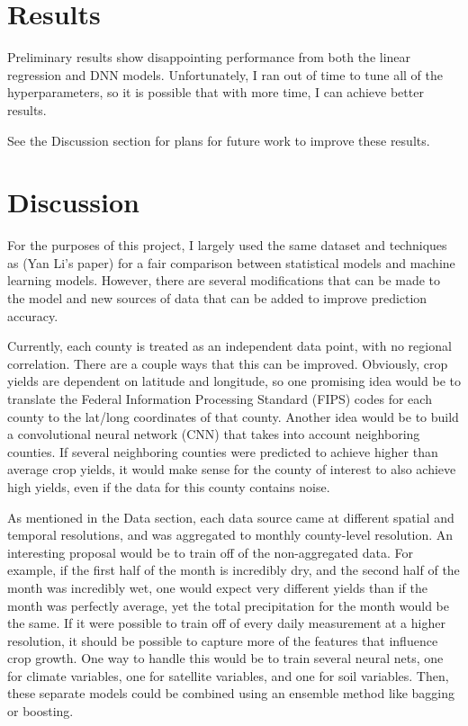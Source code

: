 \documentclass[letterpaper]{article}
\begin{document}
\section{Results}

Preliminary results show disappointing performance from both the linear regression and DNN models. Unfortunately, I ran out of time to tune all of the hyperparameters, so it is possible that with more time, I can achieve better results.

See the Discussion section for plans for future work to improve these results.

\section{Discussion}

For the purposes of this project, I largely used the same dataset and techniques as (Yan Li's paper) for a fair comparison between statistical models and machine learning models. However, there are several modifications that can be made to the model and new sources of data that can be added to improve prediction accuracy.

Currently, each county is treated as an independent data point, with no regional correlation. There are a couple ways that this can be improved. Obviously, crop yields are dependent on latitude and longitude, so one promising idea would be to translate the Federal Information Processing Standard (FIPS) codes for each county to the lat/long coordinates of that county. Another idea would be to build a convolutional neural network (CNN) that takes into account neighboring counties. If several neighboring counties were predicted to achieve higher than average crop yields, it would make sense for the county of interest to also achieve high yields, even if the data for this county contains noise.

As mentioned in the Data section, each data source came at different spatial and temporal resolutions, and was aggregated to monthly county-level resolution. An interesting proposal would be to train off of the non-aggregated data. For example, if the first half of the month is incredibly dry, and the second half of the month was incredibly wet, one would expect very different yields than if the month was perfectly average, yet the total precipitation for the month would be the same. If it were possible to train off of every daily measurement at a higher resolution, it should be possible to capture more of the features that influence crop growth. One way to handle this would be to train several neural nets, one for climate variables, one for satellite variables, and one for soil variables. Then, these separate models could be combined using an ensemble method like bagging or boosting.
\end{document}
